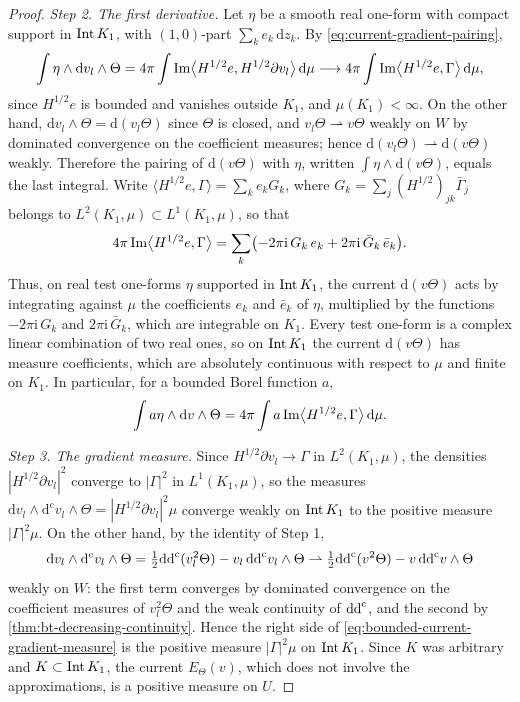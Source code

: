 \begin{proof}
\emph{Step 2. The first derivative.}
Let $\eta$ be a smooth real one-form with compact support in $\operatorname{Int} K_1$, with $(1,0)$-part $\sum_ke_k\,\mathrm dz_k$. By \eqref{eq:current-gradient-pairing},
\[
 \int\eta\wedge\mathrm dv_l\wedge\Theta
 =4\pi\int\operatorname{Im}\bigl\langle H^{1/2}e,H^{1/2}\partial v_l\bigr\rangle\,\mathrm d\mu
 \longrightarrow4\pi\int\operatorname{Im}\bigl\langle H^{1/2}e,\Gamma\bigr\rangle\,\mathrm d\mu,
\]
since $H^{1/2}e$ is bounded and vanishes outside $K_1$, and $\mu(K_1)<\infty$. On the other hand, $\mathrm dv_l\wedge\Theta=\mathrm d(v_l\Theta)$ since $\Theta$ is closed, and $v_l\Theta\rightharpoonup v\Theta$ weakly on $W$ by dominated convergence on the coefficient measures; hence $\mathrm d(v_l\Theta)\rightharpoonup\mathrm d(v\Theta)$ weakly. Therefore the pairing of $\mathrm d(v\Theta)$ with $\eta$, written $\int\eta\wedge\mathrm d(v\Theta)$, equals the last integral. Write $\langle H^{1/2}e,\Gamma\rangle=\sum_ke_kG_k$, where $G_k=\sum_j(H^{1/2})_{jk}\bar\Gamma_j$ belongs to $L^2(K_1,\mu)\subset L^1(K_1,\mu)$, so that
\[
 4\pi\operatorname{Im}\bigl\langle H^{1/2}e,\Gamma\bigr\rangle
 =\sum_k\bigl(-2\pi\mathrm i\,G_k\,e_k+2\pi\mathrm i\,\bar G_k\,\bar e_k\bigr).
\]
Thus, on real test one-forms $\eta$ supported in $\operatorname{Int} K_1$, the current $\mathrm d(v\Theta)$ acts by integrating against $\mu$ the coefficients $e_k$ and $\bar e_k$ of $\eta$, multiplied by the functions $-2\pi\mathrm i\,G_k$ and $2\pi\mathrm i\,\bar G_k$, which are integrable on $K_1$. Every test one-form is a complex linear combination of two real ones, so on $\operatorname{Int} K_1$ the current $\mathrm d(v\Theta)$ has measure coefficients, which are absolutely continuous with respect to $\mu$ and finite on $K_1$. In particular, for a bounded Borel function $a$,
\[
 \int a\eta\wedge\mathrm dv\wedge\Theta=4\pi\int a\operatorname{Im}\bigl\langle H^{1/2}e,\Gamma\bigr\rangle\,\mathrm d\mu.
\]

\emph{Step 3. The gradient measure.}
Since $H^{1/2}\partial v_l\to\Gamma$ in $L^2(K_1,\mu)$, the densities $|H^{1/2}\partial v_l|^2$ converge to $|\Gamma|^2$ in $L^1(K_1,\mu)$, so the measures $\mathrm dv_l\wedge\mathrm d^{\mathrm c}v_l\wedge\Theta=|H^{1/2}\partial v_l|^2\mu$ converge weakly on $\operatorname{Int} K_1$ to the positive measure $|\Gamma|^2\mu$. On the other hand, by the identity of Step 1,
\[
 \mathrm dv_l\wedge\mathrm d^{\mathrm c}v_l\wedge\Theta
 =\tfrac12\mathrm{dd}^{\mathrm{c}}(v_l^2\Theta)-v_l\,\mathrm{dd}^{\mathrm{c}} v_l\wedge\Theta
 \rightharpoonup\tfrac12\mathrm{dd}^{\mathrm{c}}(v^2\Theta)-v\,\mathrm{dd}^{\mathrm{c}} v\wedge\Theta
\]
weakly on $W$: the first term converges by dominated convergence on the coefficient measures of $v_l^2\Theta$ and the weak continuity of $\mathrm{dd}^{\mathrm{c}}$, and the second by \cref{thm:bt-decreasing-continuity}. Hence the right side of \eqref{eq:bounded-current-gradient-measure} is the positive measure $|\Gamma|^2\mu$ on $\operatorname{Int} K_1$. Since $K$ was arbitrary and $K\subset\operatorname{Int} K_1$, the current $E_\Theta(v)$, which does not involve the approximations, is a positive measure on $U$.


\end{proof}
